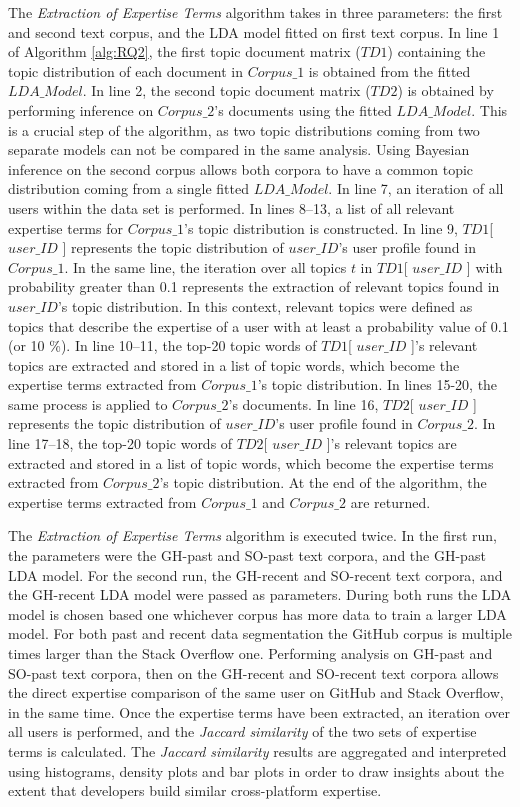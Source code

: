        The \emph{Extraction of Expertise Terms} algorithm takes in three parameters: the first and second text corpus, and the LDA model fitted on first text corpus. In line 1 of Algorithm \ref{alg:RQ2}, the first topic document matrix ($TD1$) containing the topic distribution of each document in $Corpus\_1$ is obtained from the fitted $LDA\_Model$. In line 2, the second topic document matrix ($TD2$) is obtained by performing inference on $Corpus\_2$'s documents using the fitted $LDA\_Model$. This is a crucial step of the algorithm, as two topic distributions coming from two separate models can not be compared in the same analysis. Using Bayesian inference on the second corpus allows both corpora to have a common topic distribution coming from a single fitted $LDA\_Model$. In line 7, an iteration of all users within the data set is performed. In lines 8--13, a list of all relevant expertise terms for $Corpus\_1$'s topic distribution is constructed. In line 9,  $TD1$[ $user\_ID$ ] represents the topic distribution of $user\_ID$'s user profile found in $Corpus\_1$. In the same line, the iteration over all topics $t$ in $TD1$[ $user\_ID$ ] with probability greater than 0.1 represents the extraction of relevant topics found in $user\_ID$'s topic distribution. In this context, relevant topics were defined as topics that describe the expertise of a user with at least a probability value of 0.1 (or 10 \%). In line 10--11, the top-20 topic words of $TD1$[ $user\_ID$ ]'s relevant topics are extracted and stored in a list of topic words, which become the expertise terms extracted from $Corpus\_1$'s topic distribution. In lines 15-20, the same process is applied to $Corpus\_2$'s documents. In line 16,  $TD2$[ $user\_ID$ ] represents the topic distribution of $user\_ID$'s user profile found in $Corpus\_2$. In line 17--18, the top-20 topic words of $TD2$[ $user\_ID$ ]'s relevant topics are extracted and stored in a list of topic words, which become the expertise terms extracted from $Corpus\_2$'s topic distribution. At the end of the algorithm, the expertise terms extracted from $Corpus\_1$ and $Corpus\_2$ are returned.
        
        The \emph{Extraction of Expertise Terms} algorithm is executed twice. In the first run, the parameters were the GH-past and SO-past text corpora, and the GH-past LDA model. For the second run, the GH-recent and SO-recent text corpora, and the GH-recent LDA model were passed as parameters. During both runs the LDA model is chosen based one whichever corpus has more data to train a larger LDA model. For both past and recent data segmentation the GitHub corpus is multiple times larger than the Stack Overflow one. Performing analysis on GH-past and SO-past text corpora, then on the GH-recent and SO-recent text corpora allows the direct expertise comparison of the same user on GitHub and Stack Overflow, in the same time. Once the expertise terms have been extracted, an iteration over all users is performed, and the \emph{Jaccard similarity} of the two sets of expertise terms is calculated. The \emph{Jaccard similarity} results are aggregated and interpreted using histograms, density plots and bar plots in order to draw insights about the extent that developers build similar cross-platform expertise.
    

